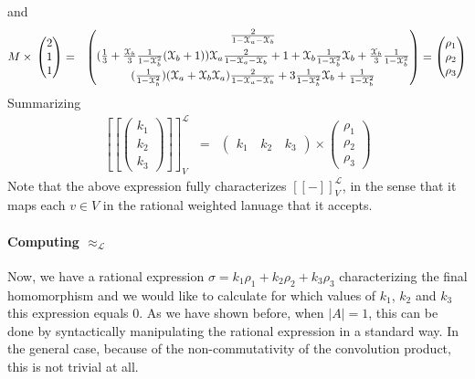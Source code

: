 \documentclass[3p]{elsarticle}
\newcommand{\fL}{\mathcal{L}}    %
\newcommand{\streamproduct}{\times} %
\newcommand{\beh}[3]{\left[\!\left[ #1 \right]\!\right]^{#2}_{#3}} %
\begin{document}
and
\begin{eqnarray*}
M  \streamproduct \, \begin{pmatrix} 2 \\ 1\\1
\end{pmatrix} &=& \begin{pmatrix}
\frac{2}{1-\Xa-\Xb} \\[1.2ex]
(\frac 1 3+
\frac{\Xb}{3}\frac{1}{1-\Xb^2} (\Xb+1) ) \Xa\frac{2}{1-\Xa-\Xb} + 1 +
\Xb\frac{1}{1-\Xb^2}\Xb + \frac{\Xb}{3}\frac{1}{1-\Xb^2}\\[1.2ex]
(\frac{1}{1-\Xb^2}) (\Xa + \Xb \Xa)
\frac{2}{1-\Xa-\Xb} + 3 \frac{1}{1-\Xb^2} \Xb +
\frac{1}{1-\Xb^2}
\end{pmatrix} = \begin{pmatrix} \rho_1 \\ \rho_2 \\ \rho_3 \end{pmatrix}
\end{eqnarray*}
Summarizing
\begin{eqnarray}
\beh{\begin{pmatrix} k_1 \\ k_2 \\k_3
\end{pmatrix}}{\fL}{V} & = &
\begin{pmatrix}
k_1 \,  & k_2 \,  & k_3
\end{pmatrix}
\streamproduct
\begin{pmatrix} \rho_1 \\ \rho_2 \\ \rho_3 \end{pmatrix}
\end{eqnarray}
Note that the above expression fully characterizes $\beh{-}{\fL}{V}$,
in the sense that it maps each $v\in V$ in the rational weighted lanuage that it accepts.

\paragraph{Computing $\approx_{\fL}$} Now, we have a rational expression $\sigma = k_1 \rho_1 + k_2 \rho_2 +
k_3 \rho_3$ characterizing the final homomorphism and we would like to calculate for which values of $k_1$, $k_2$ and $k_3$ this expression equals $0$.
As we have shown before, when $|A|=1$, this can be done by syntactically manipulating the rational expression in a standard way.
In the general case, because of the non-commutativity of the convolution product, this is not trivial at all.
\end{document}
